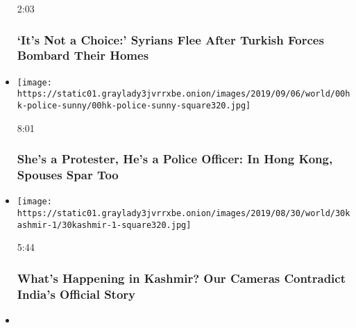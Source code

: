 \begin{itemize}
  2:03

  \hypertarget{its-not-a-choice-syrians-flee-after-turkish-forces-bombard-their-homes}{%
  \subsubsection{`It's Not a Choice:' Syrians Flee After Turkish Forces
  Bombard Their
  Homes}\label{its-not-a-choice-syrians-flee-after-turkish-forces-bombard-their-homes}}
\item
  \href{https://www.nytimes3xbfgragh.onion/video/world/asia/100000006682566/shes-a-protester-hes-a-police-officer-in-hong-kong-spouses-spar-too.html?action=click\&module=video-series-bar\&region=header\&pgtype=Article\&playlistId=video/on-the-ground}{}

  \texttt{[image: https://static01.graylady3jvrrxbe.onion/images/2019/09/06/world/00hk-police-sunny/00hk-police-sunny-square320.jpg]}

  8:01

  \hypertarget{shes-a-protester-hes-a-police-officer-in-hong-kong-spouses-spar-too}{%
  \subsubsection{She's a Protester, He's a Police Officer: In Hong Kong,
  Spouses Spar
  Too}\label{shes-a-protester-hes-a-police-officer-in-hong-kong-spouses-spar-too}}
\item
  \href{https://www.nytimes3xbfgragh.onion/video/world/asia/100000006676350/kashmir-india-article370.html?action=click\&module=video-series-bar\&region=header\&pgtype=Article\&playlistId=video/on-the-ground}{}

  \texttt{[image: https://static01.graylady3jvrrxbe.onion/images/2019/08/30/world/30kashmir-1/30kashmir-1-square320.jpg]}

  5:44

  \hypertarget{whats-happening-in-kashmir-our-cameras-contradict-indias-official-story}{%
  \subsubsection{What's Happening in Kashmir? Our Cameras Contradict
  India's Official
  Story}\label{whats-happening-in-kashmir-our-cameras-contradict-indias-official-story}}
\item
  \href{https://www.nytimes3xbfgragh.onion/video/world/asia/100000006664889/we-may-die-we-may-be-jailed-on-the-frontlines-with-hong-kongs-protesters.html?action=click\&module=video-series-bar\&region=header\&pgtype=Article\&playlistId=video/on-the-ground}{}


\end{itemize}
